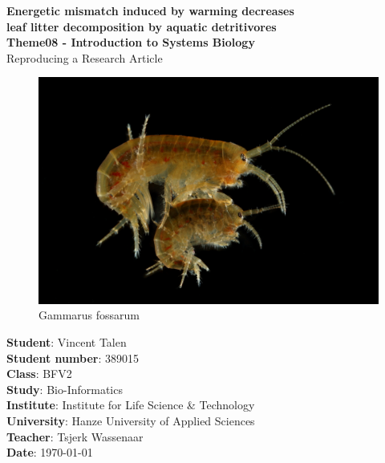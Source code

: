 

\begin{center}
  \topskip=45pt
  \LARGE{\textbf{Energetic mismatch induced by warming decreases\\leaf litter decomposition by aquatic detritivores}}\\
  \vspace*{20pt}
  \large{\textbf{Theme08 - Introduction to Systems Biology}}\\
  \large{Reproducing a Research Article}\\
  \vspace*{40pt}
  \begin{figure}
    \centering
    \includegraphics[width=130mm]{figures/gammarus_fossarum.jpeg}
    \caption{Gammarus fossarum}
    \label{fig:g.fossarum}
  \end{figure}
\end{center}
\vspace*{\fill}
\begin{flushright}
  \textbf{Student}: Vincent Talen\\
  \textbf{Student number}: 389015\\
  \textbf{Class}: BFV2\\
  \textbf{Study}: Bio-Informatics\\
  \textbf{Institute}: Institute for Life Science \& Technology\\
  \textbf{University}: Hanze University of Applied Sciences\\
  \textbf{Teacher}: Tsjerk Wassenaar\\
  \textbf{Date}: \today\\
\end{flushright}


\newpage
\null


\newpage
{}



\newpage
\setcounter{secnumdepth}{2}
\renewcommand{\contentsname}{Table of Contents}
\tableofcontents


\newpage
\listoffigures 
\listoftables


\newpage
